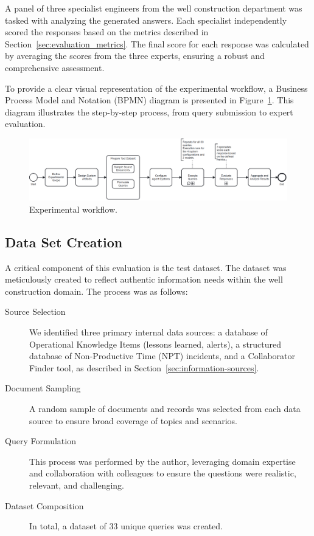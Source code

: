             A panel of three specialist engineers from the well construction department was tasked with analyzing the generated answers. Each specialist independently scored the responses based on the metrics described in Section~\ref{sec:evaluation_metrics}. The final score for each response was calculated by averaging the scores from the three experts, ensuring a robust and comprehensive assessment.
            

            To provide a clear visual representation of the experimental workflow, a Business Process Model and Notation (BPMN) diagram is presented in Figure~\ref{fig:experimental_workflow}. This diagram illustrates the step-by-step process, from query submission to expert evaluation.

            \begin{figure}[h]
                \centering
                \includegraphics[width=\textwidth]{images/bpmn_experimento_1.png}
                \caption{Experimental workflow.}
                \label{fig:experimental_workflow}
            \end{figure}

            
        \subsection{Data Set Creation}

            A critical component of this evaluation is the test dataset. The dataset was meticulously created to reflect authentic information needs within the well construction domain. The process was as follows:

            \begin{description}
                \item[Source Selection] We identified three primary internal data sources: a database of Operational Knowledge Items (lessons learned, alerts), a structured database of Non-Productive Time (NPT) incidents, and a Collaborator Finder tool, as described in Section~\ref{sec:information-sources}.
                \item[Document Sampling] A random sample of documents and records was selected from each data source to ensure broad coverage of topics and scenarios.
                \item[Query Formulation] This process was performed by the author, leveraging domain expertise and collaboration with colleagues to ensure the questions were realistic, relevant, and challenging.
                \item[Dataset Composition] In total, a dataset of 33 unique queries was created. 
            \end{description}

